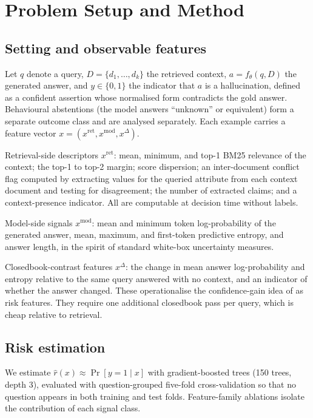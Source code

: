 \documentclass[sn-basic]{sn-jnl}
\theoremstyle{thmstyleone}
\theoremstyle{thmstyletwo}
\begin{document}
\section{Problem Setup and Method}\label{sec:method}

\subsection{Setting and observable features}
Let $q$ denote a query, $D = \{d_1, \dots, d_k\}$ the retrieved
context, $a = f_\theta(q, D)$ the generated answer, and
$y \in \{0, 1\}$ the indicator that $a$ is a hallucination, defined as
a confident assertion whose normalised form contradicts the gold
answer. Behavioural abstentions (the model answers ``unknown'' or
equivalent) form a separate outcome class and are analysed separately.
Each example carries a feature vector
$x = (x^{\mathrm{ret}}, x^{\mathrm{mod}}, x^{\Delta})$.

Retrieval-side descriptors $x^{\mathrm{ret}}$: mean, minimum, and top-1
BM25 relevance of the context; the top-1 to top-2 margin; score
dispersion; an inter-document conflict flag computed by extracting
values for the queried attribute from each context document and testing
for disagreement; the number of extracted claims; and a
context-presence indicator. All are computable at decision time without
labels.

Model-side signals $x^{\mathrm{mod}}$: mean and minimum token
log-probability of the generated answer, mean, maximum, and first-token
predictive entropy, and answer length, in the spirit of standard
white-box uncertainty measures.

Closedbook-contrast features $x^{\Delta}$: the change in mean answer
log-probability and entropy relative to the same query answered with no
context, and an indicator of whether the answer changed. These
operationalise the confidence-gain idea of \citet{bi2025ckplug} as risk
features. They require one additional closedbook pass per query, which
is cheap relative to retrieval.

\subsection{Risk estimation}
We estimate $\hat r(x) \approx \Pr[y = 1 \mid x]$ with
gradient-boosted trees (150 trees, depth 3), evaluated with
question-grouped five-fold cross-validation so that no question appears
in both training and test folds. Feature-family ablations isolate the
contribution of each signal class.
\end{document}
